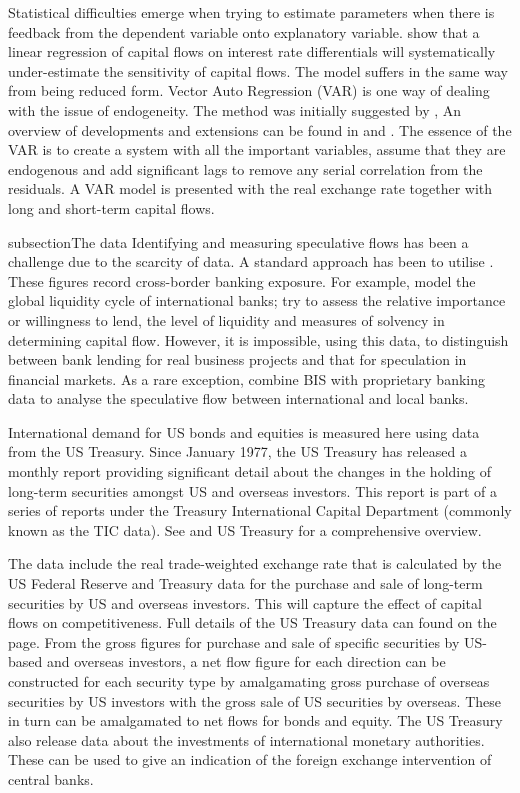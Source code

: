 \documentclass[jrfm,communication,submit,moreauthors,pdftex]{Definitions/mdpi}
\begin{document}
Statistical difficulties emerge when trying to estimate parameters when there is feedback from the dependent variable onto explanatory variable.\citet{Kouri1974International} show that a linear regression of capital flows on interest rate differentials will systematically under-estimate the sensitivity of capital flows. The \citet{brookscapital} model suffers in the same way from being reduced form.     Vector Auto Regression (VAR) is one way of dealing with the issue of endogeneity.  The method was initially suggested by \citet{Sims1980Macroeconomics},  An overview of developments and extensions can be found in \citet{lutkepohlvar} and \citet{Hamilton}.  The essence of the VAR is to create a system with all the important variables, assume that they are endogenous and add significant lags to remove any serial correlation from the residuals.  A VAR model is presented with the real exchange rate together with long and short-term capital flows. 

subsection{The data}
Identifying and measuring speculative flows has been a challenge due to the scarcity of data.  A standard approach has been to utilise \citet{BISbanking}. These figures record cross-border banking exposure.  For example, \citet{Bruno2014} model the global liquidity cycle of international banks; \citet{AdamsKaneGlobal} try to assess the relative importance or willingness to lend, the level of liquidity and measures of solvency in determining capital flow.  However, it is impossible, using this data, to distinguish between bank lending for real business projects and that for speculation in financial markets.  As a rare exception, \citet{Cerutti2014} combine BIS with proprietary banking data to analyse the speculative flow between international and local banks. 

International demand for US bonds and equities is measured here using data from the US Treasury. Since January 1977, the US Treasury has released a monthly report providing significant detail about the changes in the holding of long-term securities amongst US and overseas investors. This report is part of a series of reports under the Treasury International Capital Department (commonly known as the TIC data).  See \citet[p. 29]{Siourounis2004Capital} and US Treasury \citet{TIC} for a comprehensive overview. 

The data include the real trade-weighted exchange rate that is calculated by the US Federal Reserve and Treasury data for the purchase and sale of long-term securities by US and overseas investors.  This will capture the effect of capital flows on competitiveness.  Full details of the US Treasury data can found on the \citep{TIC} page.  From the gross figures for purchase and sale of specific securities by US-based and overseas investors, a net flow figure for each direction can be constructed for each security type by amalgamating gross purchase of overseas securities by US investors with the gross sale of US securities by overseas.  These in turn can be amalgamated to net flows for bonds and equity.  The US Treasury also release data about the investments of international monetary authorities.  These can be used to give an indication of the foreign exchange intervention of central banks. 
\end{document}
